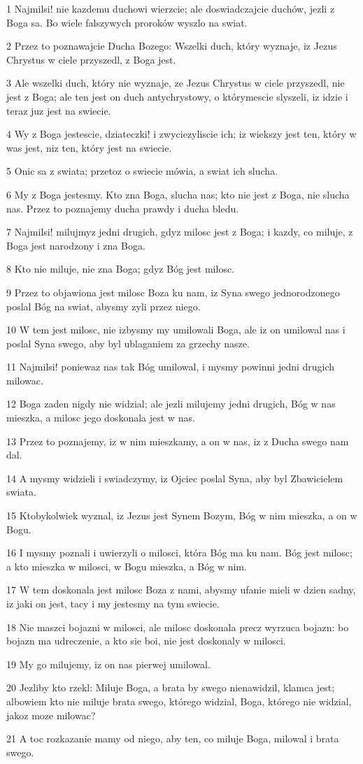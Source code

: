 \par 1 Najmilsi! nie kazdemu duchowi wierzcie; ale doswiadczajcie duchów, jezli z Boga sa. Bo wiele falszywych proroków wyszlo na swiat.
\par 2 Przez to poznawajcie Ducha Bozego: Wszelki duch, który wyznaje, iz Jezus Chrystus w ciele przyszedl, z Boga jest.
\par 3 Ale wszelki duch, który nie wyznaje, ze Jezus Chrystus w ciele przyszedl, nie jest z Boga; ale ten jest on duch antychrystowy, o którymescie slyszeli, iz idzie i teraz juz jest na swiecie.
\par 4 Wy z Boga jestescie, dziateczki! i zwyciezyliscie ich; iz wiekszy jest ten, który w was jest, niz ten, który jest na swiecie.
\par 5 Onic sa z swiata; przetoz o swiecie mówia, a swiat ich slucha.
\par 6 My z Boga jestesmy. Kto zna Boga, slucha nas; kto nie jest z Boga, nie slucha nas. Przez to poznajemy ducha prawdy i ducha bledu.
\par 7 Najmilsi! milujmyz jedni drugich, gdyz milosc jest z Boga; i kazdy, co miluje, z Boga jest narodzony i zna Boga.
\par 8 Kto nie miluje, nie zna Boga; gdyz Bóg jest milosc.
\par 9 Przez to objawiona jest milosc Boza ku nam, iz Syna swego jednorodzonego poslal Bóg na swiat, abysmy zyli przez niego.
\par 10 W tem jest milosc, nie izbysmy my umilowali Boga, ale iz on umilowal nas i poslal Syna swego, aby byl ublaganiem za grzechy nasze.
\par 11 Najmilsi! poniewaz nas tak Bóg umilowal, i mysmy powinni jedni drugich milowac.
\par 12 Boga zaden nigdy nie widzial; ale jezli milujemy jedni drugich, Bóg w nas mieszka, a milosc jego doskonala jest w nas.
\par 13 Przez to poznajemy, iz w nim mieszkamy, a on w nas, iz z Ducha swego nam dal.
\par 14 A mysmy widzieli i swiadczymy, iz Ojciec poslal Syna, aby byl Zbawicielem swiata.
\par 15 Ktobykolwiek wyznal, iz Jezus jest Synem Bozym, Bóg w nim mieszka, a on w Bogu.
\par 16 I mysmy poznali i uwierzyli o milosci, która Bóg ma ku nam. Bóg jest milosc; a kto mieszka w milosci, w Bogu mieszka, a Bóg w nim.
\par 17 W tem doskonala jest milosc Boza z nami, abysmy ufanie mieli w dzien sadny, iz jaki on jest, tacy i my jestesmy na tym swiecie.
\par 18 Nie maszci bojazni w milosci, ale milosc doskonala precz wyrzuca bojazn: bo bojazn ma udreczenie, a kto sie boi, nie jest doskonaly w milosci.
\par 19 My go milujemy, iz on nas pierwej umilowal.
\par 20 Jezliby kto rzekl: Miluje Boga, a brata by swego nienawidzil, klamca jest; albowiem kto nie miluje brata swego, którego widzial, Boga, którego nie widzial, jakoz moze milowac?
\par 21 A toc rozkazanie mamy od niego, aby ten, co miluje Boga, milowal i brata swego.

